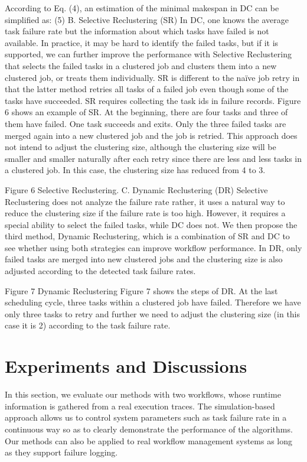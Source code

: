 \documentclass{IOS-Book-Article}
\begin{document}
According to Eq. (4), an estimation of the minimal makespan in DC can be simplified as:
                                             (5)
B.	Selective Reclustering (SR)
In DC, one knows the average task failure rate but the information about which tasks have failed is not available. In practice, it may be hard to identify the failed tasks, but if it is supported, we can further improve the performance with Selective Reclustering that selects the failed tasks in a clustered job and clusters them into a new clustered job, or treats them individually. SR is different to the naïve job retry in that the latter method retries all tasks of a failed job even though some of the tasks have succeeded. SR requires collecting the task ids in failure records. 
Figure 6 shows an example of SR. At the beginning, there are four tasks and three of them have failed. One task succeeds and exits. Only the three failed tasks are merged again into a new clustered job and the job is retried. This approach does not intend to adjust the clustering size, although the clustering size will be smaller and smaller naturally after each retry since there are less and less tasks in a clustered job. In this case, the clustering size has reduced from 4 to 3.
 
Figure 6	Selective Reclustering.
C.	Dynamic Reclustering (DR)
Selective Reclustering does not analyze the failure rate rather, it uses a natural way to reduce the clustering size if the failure rate is too high. However, it requires a special ability to select the failed tasks, while DC does not. We then propose the third method, Dynamic Reclustering, which is a combination of SR and DC to see whether using both strategies can improve workflow performance. In DR, only failed tasks are merged into new clustered jobs and the clustering size is also adjusted according to the detected task failure rates.
 
Figure 7	Dynamic Reclustering
Figure 7 shows the steps of DR. At the last scheduling cycle, three tasks within a clustered job have failed. Therefore we have only three tasks to retry and further we need to adjust the clustering size (in this case it is 2) according to the task failure rate. 

\section{Experiments and Discussions}
\label{sec:experiments}

In this section, we evaluate our methods with two workflows, whose runtime information is gathered from a real execution traces. The simulation-based approach allows us to control system parameters such as task failure rate in a continuous way so as to clearly demonstrate the performance of the algorithms. Our methods can also be applied to real workflow management systems as long as they support failure logging. 
\end{document}
